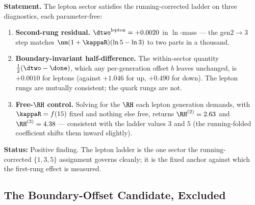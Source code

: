 \documentclass[12pt, a4paper]{article}
\begin{document}

\begin{formalbox}[title={FIND-ZC104-01: Three parameter-free confirmations of the lepton ladder ($R_1$, numerical)}]

\textbf{Statement.} The lepton sector satisfies the running-corrected ladder on
three diagnostics, each parameter-free:
\begin{enumerate}[leftmargin=2em, noitemsep]
  \item \textbf{Second-rung residual.} $\dtwo^{\rm lepton}=+0.0020$ in $\ln$-mass
    --- the gen$2{\to}3$ step matches $\nm(1+\kappaR)(\ln 5-\ln 3)$ to two parts
    in a thousand.
  \item \textbf{Boundary-invariant half-difference.} The within-sector quantity
    $\tfrac12(\dtwo-\done)$, which any per-generation offset $b$ leaves unchanged,
    is $+0.0010$ for leptons (against $+1.046$ for up, $+0.490$ for down). The
    lepton rungs are mutually consistent; the quark rungs are not.
  \item \textbf{Free-$\RH$ control.} Solving for the $\RH$ each lepton generation
    demands, with $\kappaR=f(15)$ fixed and nothing else free, returns
    $\RH^{(2)}=2.63$ and $\RH^{(3)}=4.38$ --- consistent with the ladder values
    $3$ and $5$ (the running-folded coefficient shifts them inward slightly).
\end{enumerate}

\textbf{Status:} Positive finding. The lepton ladder is the one sector the
running-corrected $\{1,3,5\}$ assignment governs cleanly; it is the fixed anchor
against which the first-rung effect is measured.
\end{formalbox}


\subsection{The Boundary-Offset Candidate, Excluded}
\label{sec:boundary-zc104}
\end{document}
